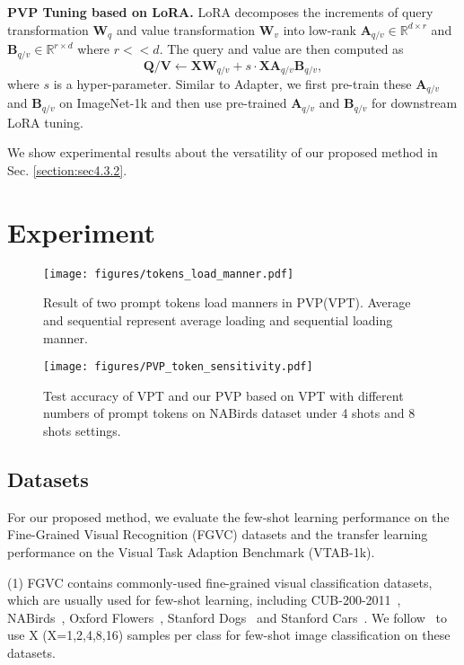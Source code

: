 \documentclass[10pt,journal,letterpaper,compsoc]{IEEEtran}
\newcommand{\myPara}[1]{\vspace{10pt}\noindent\textbf{#1.}\quad}
\begin{document}
\myPara{PVP Tuning based on LoRA}
LoRA decomposes the increments of query transformation $\boldsymbol{W}_{q}$ and value transformation $\boldsymbol{W}_{v}$ into low-rank $\boldsymbol{A}_{q/v}\in \mathbb{R}^{d\times r}$ and $\boldsymbol{B}_{q/v}\in \mathbb{R}^{r\times d}$ where $r << d$. The query and value are then computed as $$\boldsymbol{Q/V}\leftarrow\boldsymbol{XW}_{q/v}+s\cdot\boldsymbol{XA}_{q/v}\boldsymbol{B}_{q/v},$$ where $s$ is a hyper-parameter. Similar to Adapter, we first pre-train these $\boldsymbol{A}_{q/v}$ and $\boldsymbol{B}_{q/v}$ on ImageNet-1k and then use pre-trained $\boldsymbol{A}_{q/v}$ and $\boldsymbol{B}_{q/v}$ for downstream LoRA tuning.

We show experimental results about the versatility of our proposed method in Sec. \ref{section:sec4.3.2}.

\section{Experiment}

\begin{figure*}[t]
    \centering
    \texttt{[image: figures/tokens\_load\_manner.pdf]}
    \caption{Result of two prompt tokens load manners in PVP(VPT). Average and sequential represent average loading and sequential loading manner.}
    \label{fig:FULL_VPPTavg_VPPT}
\end{figure*}
\begin{figure}[h]
    \centering
    \texttt{[image: figures/PVP\_token\_sensitivity.pdf]}
    \caption{Test accuracy of VPT and our PVP based on VPT with different numbers of prompt tokens on NABirds dataset under 4 shots and 8 shots settings.}
    \label{fig:sensitivity}
\end{figure}

\subsection{Datasets}
For our proposed method, we evaluate the few-shot learning performance on the Fine-Grained Visual Recognition (FGVC) datasets and the transfer learning performance on the Visual Task Adaption Benchmark (VTAB-1k).

(1) FGVC contains commonly-used fine-grained visual classification datasets, which are usually used for few-shot learning, including CUB-200-2011~\cite{cub}, NABirds~\cite{nabirds}, Oxford Flowers~\cite{flowers}, Stanford Dogs~\cite{dogs} and Stanford Cars~\cite{cars}. We follow~\cite{NOAH,SSF} to use X (X=1,2,4,8,16) samples per class for few-shot image classification on these datasets.
\end{document}
